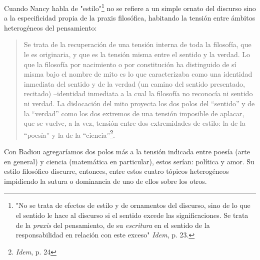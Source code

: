 \documentclass{book}
\begin{document}
Cuando Nancy habla de "estilo"\footnote{"No se trata de efectos de
  estilo y de ornamentos del discurso, sino de lo que el sentido le hace
  al discurso si el sentido excede las significaciones. Se trata de la
  \emph{praxis} del pensamiento, de su \emph{escritura} en el sentido de
  la responsabilidad en relación con este exceso" \emph{Idem}, p. 23.}
no se refiere a un simple ornato del discurso sino a la especificidad
propia de la praxis filosófica, habitando la tensión entre ámbitos
heterogéneos del pensamiento:

\begin{quote}
Se trata de la recuperación de una tensión interna de toda la filosofía,
que le es originaria, y que es la tensión misma entre el sentido y la
verdad. Lo que la filosofía por nacimiento o por constitución ha
distinguido de sí misma bajo el nombre de mito es lo que caracterizaba
como una identidad inmediata del sentido y de la verdad (un camino del
sentido presentado, recitado) --identidad inmediata a la cual la
filosofía no reconocía ni sentido ni verdad. La dislocación del mito
proyecta los dos polos del ``sentido'' y de la ``verdad'' como los dos
extremos de una tensión imposible de aplacar, que se vuelve, a la vez,
tensión entre dos extremidades de estilo: la de la ``poesía'' y la de la
``ciencia''\footnote{\emph{Idem}, p. 24}.
\end{quote}

Con Badiou agregaríamos dos polos más a la tensión indicada entre poesía
(arte en general) y ciencia (matemática en particular), estos serían:
política y amor. Su estilo filosófico discurre, entonces, entre estos
cuatro tópicos heterogéneos impidiendo la sutura o dominancia de uno de
ellos sobre los otros.
\end{document}
